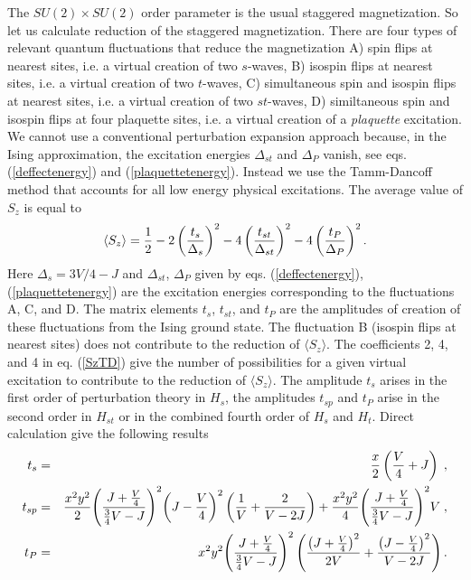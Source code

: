 The $SU(2)\times SU(2)$ order parameter is the usual staggered magnetization.
So let us calculate reduction of the staggered magnetization.
There are four types of relevant quantum fluctuations that reduce the
magnetization A) spin flips at nearest sites, i.e. a virtual creation of two
$s$-waves, B) isospin flips at nearest sites, i.e. a virtual creation of two
$t$-waves, C) simultaneous spin and isospin flips at nearest sites,
i.e. a virtual creation of two $st$-waves, D) similtaneous spin and isospin
flips at four plaquette sites, i.e. a virtual creation of a {\it plaquette}
excitation. We cannot use a conventional perturbation expansion approach
because, in the Ising approximation,
the excitation energies $\Delta_{st}$ and $\Delta_P$ vanish, see eqs.
(\ref{deffectenergy}) and (\ref{plaquettetenergy}). 
Instead we use the Tamm-Dancoff method \cite{TD} that accounts for all low
energy physical excitations. The average value of $S_z$ is equal to
\begin{equation}
\label{SzTD}
\langle S_z \rangle =
{1\over{2}}-2\left({{t_s}\over{\Delta_s}}\right)^2
-4\left({{t_{st}}\over{\Delta_{st}}}\right)^2
-4\left({{t_{P}}\over{\Delta_{P}}}\right)^2.
\end{equation}
Here $\Delta_s=3V/4-J$ and $\Delta_{st}$, $\Delta_P$ given by eqs.
(\ref{deffectenergy}),(\ref{plaquettetenergy}) are the excitation
energies corresponding to the fluctuations A, C, and D.
The matrix elements $t_s$, $t_{st}$, and $t_P$ are the amplitudes of 
creation of these fluctuations from the Ising ground state.
The fluctuation B (isospin flips at nearest sites) does not contribute to
the reduction of $\langle S_z \rangle$. The coefficients 2, 4, and 4 in 
eq. (\ref{SzTD}) give the number of possibilities for a given virtual 
excitation to contribute to the reduction of $\langle S_z \rangle$.
The amplitude $t_s$ arises in the first order of perturbation theory
in $H_s$, the amplitudes $t_{sp}$ and $t_P$ arise in the second order in 
$H_{st}$ or in the combined fourth order of $H_s$ and $H_t$.
Direct calculation give the following results
\begin{eqnarray}
\label{ttt}
t_s&=& {x\over 2} \left( {V\over 4}+ J \right )\; , \nonumber\\
t_{sp} & =& {{x^2y^2}\over 2} 
{  \left(
               {  { J+{V\over 4} }   \over { {3\over 4}V -J }}
\right )  }^2 
{\left(  J-{V\over 4} \right) }^2
\left( {1\over V} + {2\over {V-2J}} \right) 
+
 {{x^2y^2}\over 4} 
{  \left(
               {  { J+{V\over 4} }   \over { {3\over 4}V -J }}
\right )  }^2 V\; ,\\ 
t_P &=& x^2y^2
{  \left(
               {  { J+{V\over 4} }   \over { {3\over 4}V -J }}
\right )  }^2 
\left( 
{
   {  \left(  J+{V\over 4} \right)^2  }
   \over
   {2V}
}
+
{
   {  \left(  J-{V\over 4} \right)^2  }
   \over
   {V-2J}
}
\right).\nonumber
\end{eqnarray}
